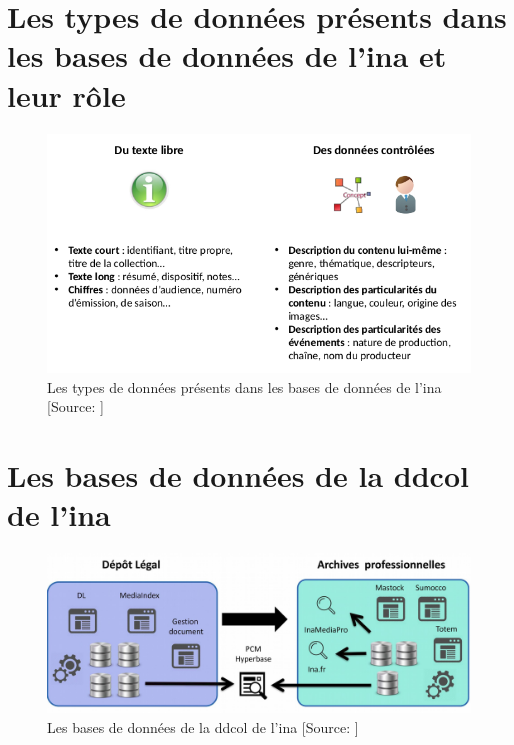 \chapter{\label{annexe_type_donnees_axel}Les types de données présents dans les bases de données de l'\ac{ina} et leur rôle}

\begin{figure}[!h]
	\centering
	\includegraphics[width=15cm]{images/type_donnees_axel.png}
	\medskip
	\caption[Les types de données présents dans les bases de données de l'\ac{ina}]{Les types de données présents dans les bases de données de l'\ac{ina} [Source: \cite[p.6]{roche-diore_atelier_2020}]}
	\label{type_donnees_axel}
\end{figure}

\chapter{\label{annexe_bdd_ina}Les bases de données de la \ac{ddcol} de l'\ac{ina}}

\begin{figure}[!h]
	\centering
	\includegraphics[width=15cm]{images/bases_ddcol.png}
	\medskip
	\caption[Les bases de données de la \ac{ddcol} de l'\ac{ina}]{Les bases de données de la \ac{ddcol} de l'\ac{ina} [Source: \cite{poupeau_rassembler_2019}]}
	\label{bdd_ddcol_ina}
\end{figure}


